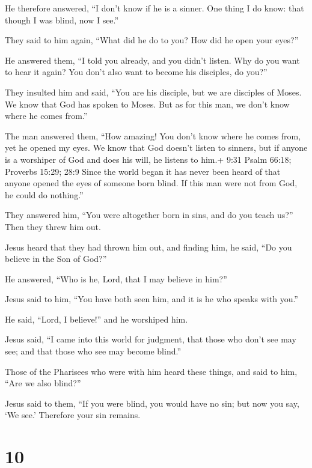  He therefore answered, ``I don't know if he is a sinner.
One thing I do know: that though I was blind, now I see.''

 They said to him again, ``What did he do to you? How did
he open your eyes?''

 He answered them, ``I told you already, and you didn't
listen. Why do you want to hear it again? You don't also want to become
his disciples, do you?''

 They insulted him and said, ``You are his disciple, but we
are disciples of Moses.  We know that God has spoken to
Moses. But as for this man, we don't know where he comes from.''

 The man answered them, ``How amazing! You don't know where
he comes from, yet he opened my eyes.  We know that God
doesn't listen to sinners, but if anyone is a worshiper of God and does
his will, he listens to him.+ 9:31 Psalm 66:18; Proverbs 15:29; 28:9
 Since the world began it has never been heard of that
anyone opened the eyes of someone born blind.  If this man
were not from God, he could do nothing.''

 They answered him, ``You were altogether born in sins, and
do you teach us?'' Then they threw him out.

 Jesus heard that they had thrown him out, and finding him,
he said, ``Do you believe in the Son of God?''

 He answered, ``Who is he, Lord, that I may believe in
him?''

 Jesus said to him, ``You have both seen him, and it is he
who speaks with you.''

 He said, ``Lord, I believe!'' and he worshiped him.

 Jesus said, ``I came into this world for judgment, that
those who don't see may see; and that those who see may become blind.''

 Those of the Pharisees who were with him heard these
things, and said to him, ``Are we also blind?''

 Jesus said to them, ``If you were blind, you would have no
sin; but now you say, `We see.' Therefore your sin remains.

\hypertarget{section-9}{%
\section{10}\label{section-9}}

